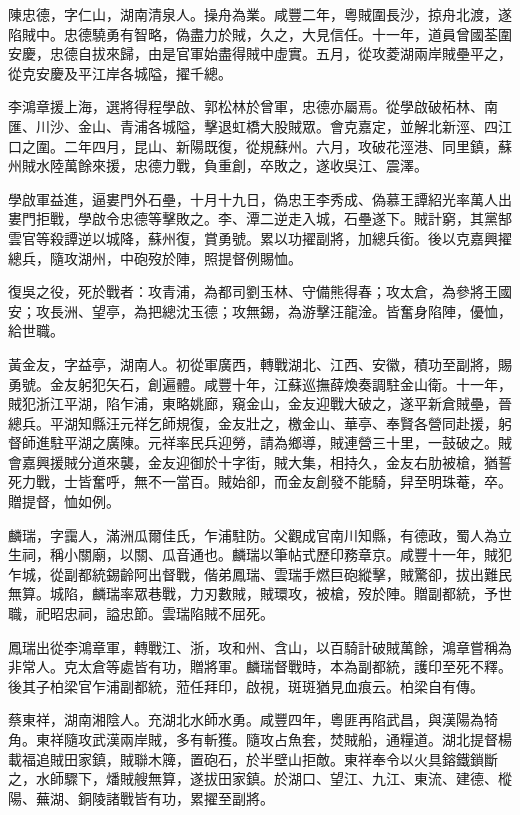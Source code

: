 \begin{pinyinscope}
陳忠德，字仁山，湖南清泉人。操舟為業。咸豐二年，粵賊圍長沙，掠舟北渡，遂陷賊中。忠德驍勇有智略，偽盡力於賊，久之，大見信任。十一年，道員曾國荃圍安慶，忠德自拔來歸，由是官軍始盡得賊中虛實。五月，從攻菱湖兩岸賊壘平之，從克安慶及平江岸各城隘，擢千總。

李鴻章援上海，選將得程學啟、郭松林於曾軍，忠德亦屬焉。從學啟破柘林、南匯、川沙、金山、青浦各城隘，擊退虹橋大股賊眾。會克嘉定，並解北新涇、四江口之圍。二年四月，昆山、新陽既復，從規蘇州。六月，攻破花涇港、同里鎮，蘇州賊水陸萬餘來援，忠德力戰，負重創，卒敗之，遂收吳江、震澤。

學啟軍益進，逼婁門外石壘，十月十九日，偽忠王李秀成、偽慕王譚紹光率萬人出婁門拒戰，學啟令忠德等擊敗之。李、潭二逆走入城，石壘遂下。賊計窮，其黨郜雲官等殺譚逆以城降，蘇州復，賞勇號。累以功擢副將，加總兵銜。後以克嘉興擢總兵，隨攻湖州，中砲歿於陣，照提督例賜恤。

復吳之役，死於戰者：攻青浦，為都司劉玉林、守備熊得春；攻太倉，為參將王國安；攻長洲、望亭，為把總沈玉德；攻無錫，為游擊汪龍淦。皆奮身陷陣，優恤，給世職。

黃金友，字益亭，湖南人。初從軍廣西，轉戰湖北、江西、安徽，積功至副將，賜勇號。金友躬犯矢石，創遍體。咸豐十年，江蘇巡撫薛煥奏調駐金山衛。十一年，賊犯浙江平湖，陷乍浦，東略姚廊，窺金山，金友迎戰大破之，遂平新倉賊壘，晉總兵。平湖知縣汪元祥乞師規復，金友壯之，檄金山、華亭、奉賢各營同赴援，躬督師進駐平湖之廣陳。元祥率民兵迎勞，請為鄉導，賊連營三十里，一鼓破之。賊會嘉興援賊分道來襲，金友迎御於十字街，賊大集，相持久，金友右肋被槍，猶誓死力戰，士皆奮呼，無不一當百。賊始卻，而金友創發不能騎，舁至明珠菴，卒。贈提督，恤如例。

麟瑞，字靄人，滿洲瓜爾佳氏，乍浦駐防。父觀成官南川知縣，有德政，蜀人為立生祠，稱小關廟，以關、瓜音通也。麟瑞以筆帖式歷印務章京。咸豐十一年，賊犯乍城，從副都統錫齡阿出督戰，偕弟鳳瑞、雲瑞手燃巨砲縱擊，賊驚卻，拔出難民無算。城陷，麟瑞率眾巷戰，力刃數賊，賊環攻，被槍，歿於陣。贈副都統，予世職，祀昭忠祠，謚忠節。雲瑞陷賊不屈死。

鳳瑞出從李鴻章軍，轉戰江、浙，攻和州、含山，以百騎計破賊萬餘，鴻章嘗稱為非常人。克太倉等處皆有功，贈將軍。麟瑞督戰時，本為副都統，護印至死不釋。後其子柏梁官乍浦副都統，蒞任拜印，啟視，斑斑猶見血痕云。柏梁自有傳。

蔡東祥，湖南湘陰人。充湖北水師水勇。咸豐四年，粵匪再陷武昌，與漢陽為犄角。東祥隨攻武漢兩岸賊，多有斬獲。隨攻占魚套，焚賊船，通糧道。湖北提督楊載福追賊田家鎮，賊聯木簰，置砲石，於半壁山拒敵。東祥奉令以火具鎔鐵鎖斷之，水師驟下，燔賊艘無算，遂拔田家鎮。於湖口、望江、九江、東流、建德、樅陽、蕪湖、銅陵諸戰皆有功，累擢至副將。


\end{pinyinscope}
